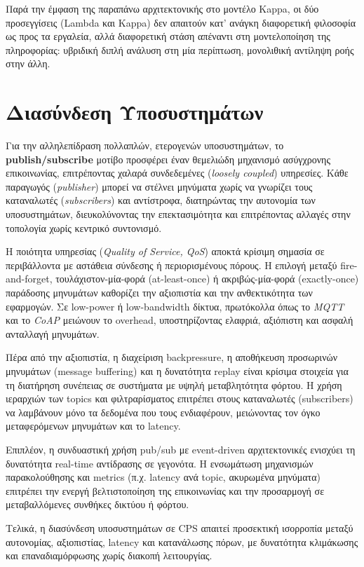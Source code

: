 Παρά την έμφαση της παραπάνω αρχιτεκτονικής στο μοντέλο Kappa, οι δύο
προσεγγίσεις (Lambda και Kappa) δεν απαιτούν κατ' ανάγκη διαφορετική φιλοσοφία
ως προς τα εργαλεία, αλλά διαφορετική στάση απέναντι στη μοντελοποίηση της
πληροφορίας: υβριδική διπλή ανάλυση στη μία περίπτωση, μονολιθική αντίληψη ροής
στην άλλη.

\section{Διασύνδεση Υποσυστημάτων}

Για την αλληλεπίδραση πολλαπλών, ετερογενών υποσυστημάτων, το
\textbf{publish/subscribe} μοτίβο προσφέρει έναν θεμελιώδη μηχανισμό ασύγχρονης
επικοινωνίας, επιτρέποντας χαλαρά συνδεδεμένες (\textit{loosely coupled})
υπηρεσίες. Κάθε παραγωγός (\textit{publisher}) μπορεί να στέλνει μηνύματα χωρίς
να γνωρίζει τους καταναλωτές (\textit{subscribers}) και αντίστροφα, διατηρώντας
την αυτονομία των υποσυστημάτων, διευκολύνοντας την επεκτασιμότητα και
επιτρέποντας αλλαγές στην τοπολογία χωρίς κεντρικό συντονισμό.

Η ποιότητα υπηρεσίας (\textit{Quality of Service, QoS}) αποκτά κρίσιμη σημασία
σε περιβάλλοντα με αστάθεια σύνδεσης ή περιορισμένους πόρους. Η επιλογή μεταξύ
fire-and-forget, τουλάχιστον-μία-φορά (at-least-once) ή ακριβώς-μία-φορά
(exactly-once) παράδοσης μηνυμάτων καθορίζει την αξιοπιστία και την
ανθεκτικότητα των εφαρμογών. Σε low-power ή low-bandwidth δίκτυα, πρωτόκολλα
όπως το \textit{MQTT} και το \textit{CoAP} μειώνουν το overhead, υποστηρίζοντας
ελαφριά, αξιόπιστη και ασφαλή ανταλλαγή μηνυμάτων.

Πέρα από την αξιοπιστία, η διαχείριση backpressure, η αποθήκευση προσωρινών
μηνυμάτων (message buffering) και η δυνατότητα replay είναι κρίσιμα στοιχεία
για τη διατήρηση συνέπειας σε συστήματα με υψηλή μεταβλητότητα φόρτου. Η χρήση
ιεραρχιών των topics και φιλτραρίσματος επιτρέπει στους καταναλωτές
(subscribers) να λαμβάνουν μόνο τα δεδομένα που τους ενδιαφέρουν, μειώνοντας
τον όγκο μεταφερόμενων μηνυμάτων και το latency.

Επιπλέον, η συνδυαστική χρήση pub/sub με event-driven αρχιτεκτονικές ενισχύει
τη δυνατότητα real-time αντίδρασης σε γεγονότα. Η ενσωμάτωση μηχανισμών
παρακολούθησης και metrics (π.χ. latency ανά topic, ακυρωμένα μηνύματα)
επιτρέπει την ενεργή βελτιστοποίηση της επικοινωνίας και την προσαρμογή σε
μεταβαλλόμενες συνθήκες δικτύου ή φόρτου.

Τελικά, η διασύνδεση υποσυστημάτων σε CPS απαιτεί προσεκτική ισορροπία μεταξύ
αυτονομίας, αξιοπιστίας, latency και κατανάλωσης πόρων, με δυνατότητα
κλιμάκωσης και επαναδιαμόρφωσης χωρίς διακοπή λειτουργίας.

